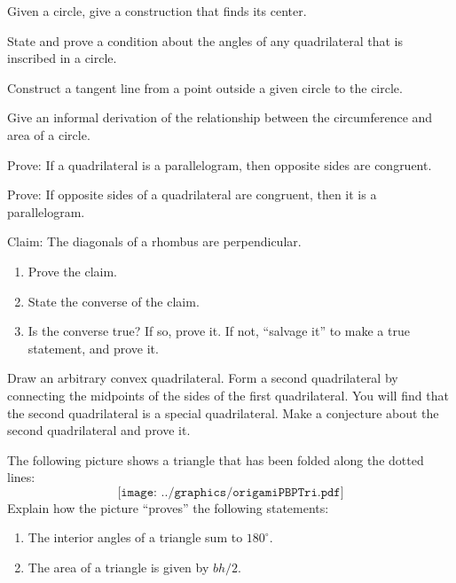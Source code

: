 \begin{prob}
Given a circle, give a construction that finds its center.
\end{prob}

\begin{prob}
State and prove a condition about the angles of any quadrilateral that is inscribed in a circle.  
\end{prob}

\begin{prob}
Construct a tangent line from a point outside a given circle to the circle.
\end{prob}

\begin{prob}
Give an informal derivation of the relationship between the circumference and area of a circle. 
\end{prob}

\begin{prob}
Prove:  If a quadrilateral is a parallelogram, then opposite sides are congruent.
\end{prob}

\begin{prob}
Prove:  If opposite sides of a quadrilateral are congruent, then it is a parallelogram.
\end{prob}

\begin{prob}
Claim:  The diagonals of a rhombus are perpendicular. 
\begin{enumerate}
\item Prove the claim. 
\item State the converse of the claim. 
\item Is the converse true?  If so, prove it.  If not, ``salvage it'' to make a true statement, and prove it.  
\end{enumerate}
\end{prob}


\begin{prob}
Draw an arbitrary convex quadrilateral.  Form a second quadrilateral by connecting the midpoints of the sides 
of the first quadrilateral.  You will find that the second quadrilateral is a special quadrilateral.  Make a conjecture about the second quadrilateral and prove it.  
\end{prob}

\begin{prob}
The following picture shows a triangle that has been folded
  along the dotted lines:
\[
\texttt{[image: ../graphics/origamiPBPTri.pdf]}
\]
Explain how the picture ``proves'' the following statements:
\begin{enumerate}
\item The interior angles of a triangle sum to $180^\circ$. 
\item The area of a triangle is given by $bh/2$. 
\end{enumerate}
\end{prob}

